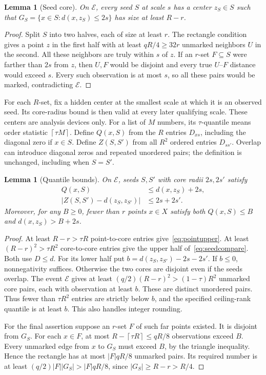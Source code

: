\documentclass[acmsmall,11pt,nonacm]{acmart}
\newtheorem{lemma}[theorem]{Lemma}
\theoremstyle{definition}
\newcommand{\calE}{\mathcal E}
\newcommand{\ceil}[1]{\left\lceil #1\right\rceil}
\begin{document}
\begin{lemma}[Seed core]\label{lem:seed}
On $\calE$, every seed $S$ at scale $s$ has a center $z_S\in S$ such
that $G_S=\{x\in S:d(x,z_S)\leq2s\}$ has size at least $R-r$.
\end{lemma}
\begin{proof}
Split $S$ into two halves, each of size at least $r$. The rectangle condition
gives a point $z$ in the first half with at least $qR/4\geq32r$ unmarked
neighbors $U$ in the second. All these neighbors are truly within $s$ of $z$.
If an $r$-set $F\subseteq S$ were farther than $2s$ from $z$, then $U,F$
would be disjoint and every true $U$--$F$ distance would exceed $s$.
Every such observation is at most $s$, so all these pairs would be marked,
contradicting $\calE$.
\end{proof}

For each $R$-set, fix a hidden center at the smallest scale at which it is
an observed seed. Its core-radius bound is then valid at every later
qualifying scale. These centers are analysis devices only.
For a list of $M$ numbers, its $\tau$-quantile means order statistic
$\ceil{\tau M}$. Define $Q(x,S)$ from the $R$ entries $D_{xs}$,
including the diagonal zero if $x\in S$. Define $Z(S,S')$ from all $R^2$
ordered entries $D_{ss'}$. Overlap can introduce diagonal zeros and repeated
unordered pairs; the definition is unchanged, including when $S=S'$.

\begin{lemma}[Quantile bounds]\label{lem:quantiles}
On $\calE$, seeds $S,S'$ with core radii $2s,2s'$ satisfy
\begin{align}
 Q(x,S)&\leq d(x,z_S)+2s,\label{eq:pointupper}\\
 |Z(S,S')-d(z_S,z_{S'})|&\leq2s+2s'.\label{eq:seedcompare}
\end{align}
Moreover, for any $B\geq0$, fewer than $r$ points $x\in X$ satisfy both
$Q(x,S)\leq B$ and $d(x,z_S)>B+2s$.
\end{lemma}
\begin{proof}
At least $R-r>\tau R$ point-to-core entries give~\eqref{eq:pointupper}.
At least $(R-r)^2>\tau R^2$ core-to-core entries give the upper half
of~\eqref{eq:seedcompare}. Both use $D\leq d$.
For its lower half put $b=d(z_S,z_{S'})-2s-2s'$. If $b\leq0$,
nonnegativity suffices. Otherwise the two cores are disjoint even if
the seeds overlap. The event $\calE$ gives at least
$(q/2)(R-r)^2>(1-\tau)R^2$ unmarked core pairs, each with observation
at least $b$. These are distinct unordered pairs. Thus fewer than
$\tau R^2$ entries are strictly below $b$, and the specified ceiling-rank
quantile is at least $b$. This also handles integer rounding.

For the final assertion suppose an $r$-set $F$ of such far points existed.
It is disjoint from $G_S$. For each $x\in F$, at most
$R-\ceil{\tau R}\leq qR/8$ observations exceed $B$. Every unmarked edge
from $x$ to $G_S$ must exceed $B$, by the triangle inequality. Hence the
rectangle has at most $|F|qR/8$ unmarked pairs. Its required number is at
least $(q/2)|F||G_S|>|F|qR/8$, since $|G_S|\geq R-r>R/4$.
\end{proof}
\end{document}
